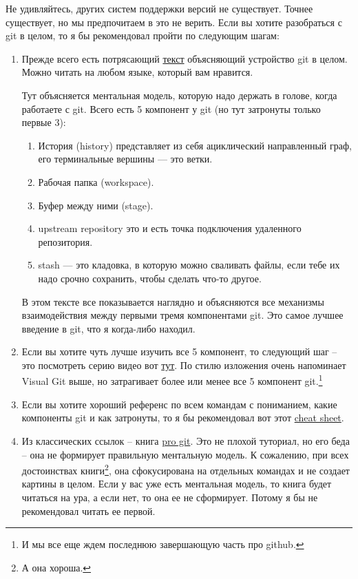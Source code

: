 \documentclass{article}
\begin{document}
Не удивляйтесь, других систем поддержки версий не существует. Точнее существует, но мы предпочитаем в это не верить. Если вы хотите разобраться с git в целом, то я бы рекомендовал пройти по следующим шагам:
\begin{enumerate}
\item Прежде всего есть потрясающий \href{https://marklodato.github.io/visual-git-guide/index-en.html}{текст} объясняющий устройство git в целом. Можно читать на любом языке, который вам нравится.

Тут объясняется ментальная модель, которую надо держать в голове, когда работаете с git. Всего есть 5 компонент у git (но тут затронуты только первые 3):
\begin{enumerate}
\item История (history) представляет из себя ациклический направленный граф, его терминальные вершины — это ветки.
\item Рабочая папка (workspace).
\item Буфер между ними (stage).
\item upstream repository это и есть точка подключения удаленного репозитория.
\item stash — это кладовка, в которую можно сваливать файлы, если тебе их надо срочно сохранить, чтобы сделать что-то другое.
\end{enumerate}
В этом тексте все показывается наглядно и объясняются все механизмы взаимодействия между первыми тремя компонентами git. Это самое лучшее введение в git, что я когда-либо находил.

\item Если вы хотите чуть лучше изучить все 5 компонент, то следующий шаг -- это посмотреть серию видео вот \href{https://www.youtube.com/playlist?list=PL9ZoDZ0U4QLBhwg-wC5UU30vDG9-9geSe}{тут}. По стилю изложения очень напоминает Visual Git выше, но затрагивает более или менее все 5 компонент git.\footnote{И мы все еще ждем последнюю завершающую часть про github.}

\item Если вы хотите хороший референс по всем командам с пониманием, какие компоненты git и как затронуты, то я бы рекомендовал вот этот \href{http://www.ndpsoftware.com/git-cheatsheet.html#loc=workspace;}{cheat sheet}.

\item Из классических ссылок -- книга \href{https://git-scm.com/book/en/v2}{pro git}. Это не плохой туториал, но его беда -- она не формирует правильную ментальную модель. К сожалению, при всех достоинствах книги\footnote{А она хороша.}, она сфокусирована на отдельных командах и не создает картины в целом. Если у вас уже есть ментальная модель, то книга будет читаться на ура, а если нет, то она ее не сформирует. Потому я бы не рекомендовал читать ее первой.


\end{enumerate}
\end{document}
